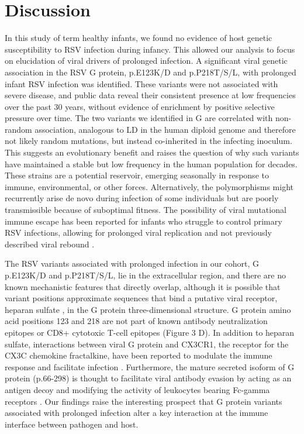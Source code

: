 \documentclass{article} %
\begin{document}
\section{Discussion}
In this study of term healthy infants, we found no evidence of host genetic susceptibility to RSV infection during infancy. 
This allowed our analysis to focus on elucidation of viral drivers of prolonged infection. 
A significant viral genetic association in the RSV G protein, p.E123K/D and p.P218T/S/L, with prolonged infant RSV infection was identified. 
These variants were not associated with severe disease, and public data reveal their consistent presence at low frequencies over the past 30 years, without evidence of enrichment by positive selective pressure over time. 
The two variants we identified in G are correlated with non-random association, analogous to LD in the human diploid genome and therefore not likely random mutations, but instead co-inherited in the infecting inoculum. 
This suggests an evolutionary benefit and raises the question of why such variants have maintained a stable but low frequency in the human population for decades. 
These strains are a potential reservoir, emerging seasonally in response to immune, environmental, or other forces. 
Alternatively, the polymorphisms might recurrently arise de novo during infection of some individuals but are poorly transmissible because of suboptimal fitness. 
The possibility of viral mutational immune escape has been reported for infants who struggle to control primary RSV infections, allowing for prolonged viral replication and not previously described viral rebound 
\citep{brint2017prolonged}.

The RSV variants associated with prolonged infection in our cohort, G p.E123K/D and p.P218T/S/L, lie in the extracellular region, and there are no known mechanistic features that directly overlap, although it is possible that variant positions approximate sequences that bind a putative viral receptor, heparan sulfate 
\citep{feldman1999identification}, in the G protein three-dimensional structure. G protein amino acid positions 123 and 218 are not part of known antibody neutralization epitopes or CD8+ cytotoxic T-cell epitopes (Figure 3 D). 
In addition to heparan sulfate, interactions between viral G protein and CX3CR1, the receptor for the CX3C chemokine fractalkine, have been reported to modulate the immune response and facilitate infection 
\citep{levine1987demonstration, feldman1999identification, feldman2000fusion, johnson2015respiratory, tripp2001cx3c, jeong2015cx3cr1}.
Furthermore, the mature secreted isoform of G protein (p.66-298) is thought to facilitate viral antibody evasion by acting as an antigen decoy and modifying the activity of leukocytes bearing Fc-gamma receptors 
\citep{bukreyev2008secreted}. 
Our findings raise the interesting prospect that G protein variants associated with prolonged infection alter a key interaction at the immune interface between pathogen and host.
\end{document}
